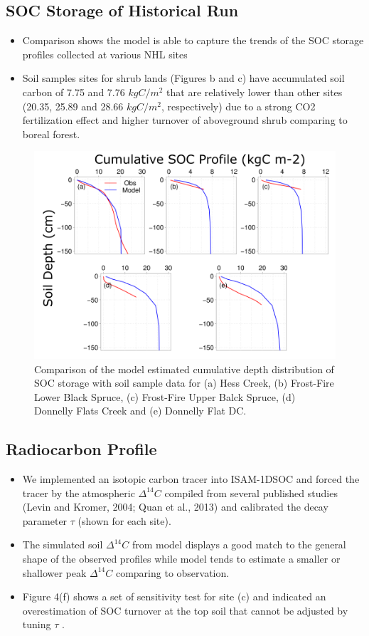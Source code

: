 \documentclass[portait,custom]{sciposter}
\begin{document}
\begin{multicols*}{4}
\subsection*{SOC Storage of Historical Run}
\begin{itemize}
  \item Comparison shows the model is able to capture the trends of the SOC storage profiles collected at various NHL sites
  \item Soil samples sites for shrub lands (Figures b and c) have accumulated soil carbon of 7.75 and 7.76 $kgC/m^2$ that are relatively lower than other sites (20.35, 25.89 and 28.66 $kgC/m^2$, respectively) due to a strong CO2 fertilization effect and higher turnover of aboveground shrub comparing to boreal forest.
\end{itemize}

\begin{figure}
 \centering
 \includegraphics[width=0.9\columnwidth]{new_figures/Historical_SOC.png}
 \caption{Comparison of the model estimated cumulative depth distribution of SOC storage with soil sample data for (a) Hess Creek, (b) Frost-Fire Lower Black Spruce, (c) Frost-Fire Upper Balck Spruce, (d) Donnelly Flats Creek and (e) Donnelly Flat DC.}\label{fig:soc_hist}
\end{figure}

\subsection*{Radiocarbon Profile}
\begin{itemize}
  \item We implemented an isotopic carbon tracer into ISAM-1DSOC and forced the tracer by the atmospheric $\Delta ^{14}C$ compiled from several published studies (Levin and Kromer, 2004; Quan et al., 2013) and calibrated the decay parameter $\tau$ (shown for each site).
  \item The simulated soil $\Delta ^{14}C$ from model displays a good match to the general shape of the observed profiles while model tends to estimate a smaller or shallower peak $\Delta ^{14}C$ comparing to observation. 
  \item Figure 4(f) shows a set of sensitivity test for site (c) and indicated an overestimation of SOC turnover at the top soil that cannot be adjusted by tuning $\tau$ .
\end{itemize}


\end{multicols*}
\end{document}
